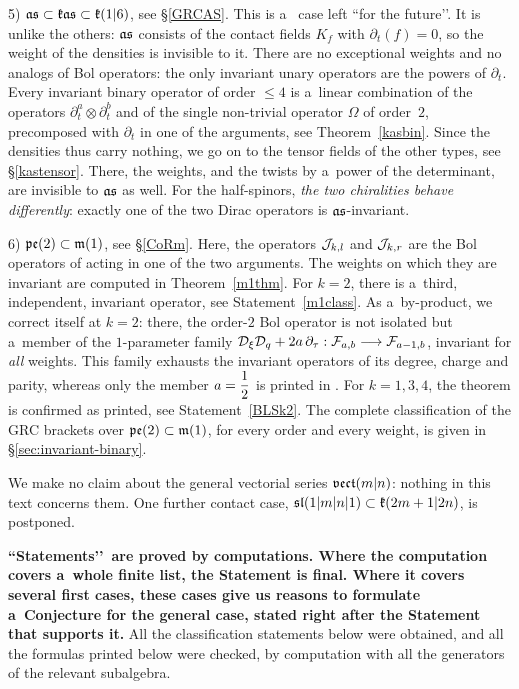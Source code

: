 \documentclass[12pt,a4paper]{amsart}
\theoremstyle{thm}
\theoremstyle{definition}
\newcommand {\Dq}{\cD_q}
\newcommand {\Dxi}{\cD_\xi}
\newcommand {\tp}{\otimes}
\begin{document}
5) ${\mathfrak{as}}\subset{\mathfrak{k}}{\mathfrak{as}}\subset{\mathfrak{k}}(1|6)$, see \S\ref{GRCAS}. This is a~ case
\cite[\S1.3.1]{BLS1} left ``for the future\rq\rq. It is unlike the others: ${\mathfrak{as}}$ consists of the
contact fields $K_f$ with $\partial_t(f)=0$, so the weight of the densities is invisible to
it. There are no exceptional weights and no analogs of Bol operators: the only invariant unary
operators are the powers of $\partial_t$. Every invariant binary operator of order $\leq4$ is a~linear combination of the operators $\partial_t^a\tp\partial_t^b$ and of the single non-trivial operator $\Omega$ of order~$2$, precomposed with $\partial_t$ in one of the arguments, see Theorem~\ref{kasbin}.  Since
the densities thus carry nothing, we go on to the tensor fields of the other types, see
\S\ref{kastensor}. There, the weights, and the twists by a~power of the determinant, are
invisible to ${\mathfrak{as}}$ as well. For the half-spinors, \textit{the two chiralities behave
differently}: exactly one of the two Dirac operators is ${\mathfrak{as}}$-invariant.

6) ${\mathfrak{pe}}(2)\subset{\mathfrak{m}}(1)$, see \S\ref{CoRm}. Here, the operators ${\mathcal J}_{k,l}$ and ${\mathcal J}_{k,r}$ are
the Bol operators of \cite[Thm~5.1]{BLS1} acting in one of the two arguments. The weights on
which they are invariant are computed in Theorem~\ref{m1thm}. For $k=2$, there is a~third,
independent, invariant operator, see Statement~\ref{m1class}. As a~by-product, we correct
\cite[Thm~5.1]{BLS1} itself at $k=2$: there, the order-$2$ Bol operator is not isolated but
a~member of the $1$-parameter family ${\Dxi\Dq+2a\,\partial_\tau:\cF_{a,b}\tto\cF_{a-1,b}}$,
invariant for \textit{all} weights. This family exhausts the invariant operators of its
degree, charge and parity, whereas only the member $a=\nfrac12$ is printed in \cite{BLS1}. For
$k=1,3,4$, the theorem is confirmed as printed, see Statement~\ref{BLSk2}. The complete classification of the GRC brackets over ${\mathfrak{pe}}(2)\subset{\mathfrak{m}}(1)$, for every order and every weight, is given in \S\ref{sec:invariant-binary}. 

We make no claim about the general vectorial series ${\mathfrak{vect}}(m|n)$: nothing in this text
concerns them. One further contact case, ${\mathfrak{sl}}(1|m|n|1)\subset{\mathfrak{k}}(2m+1|2n)$, is postponed.

\textbf{``Statements\rq\rq\ are proved by computations. Where the computation covers a~whole finite list, the Statement is final. Where it
covers several first cases, these cases give us reasons to formulate a~Conjecture for the
general case, stated right after the Statement that supports it.} All the classification statements below were
obtained, and all the formulas printed below were checked, by computation with all the
generators of the relevant subalgebra.
\end{document}
